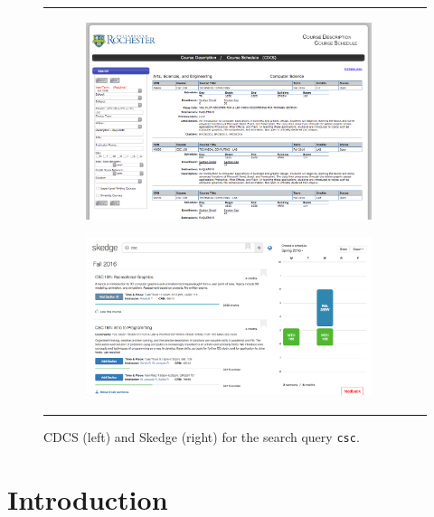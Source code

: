 \documentclass[titlepage]{article}
\begin{document}
\begin{figure}[ht]
    \centering
    \begin{tabular}{c c}
        \begin{subfigure}[h]{6.5cm}
            \centering
            \includegraphics[width=1.00\textwidth]{cdcs}
        \end{subfigure}
        \hspace{1em}
        \begin{subfigure}[h]{7.5cm}
            \centering
            \includegraphics[width=1.00\textwidth]{skedge}
        \end{subfigure}
    \end{tabular}
    \caption{CDCS (left) and Skedge (right) for the search query {\tt csc}.}
\end{figure}

\section{Introduction}
\end{document}

